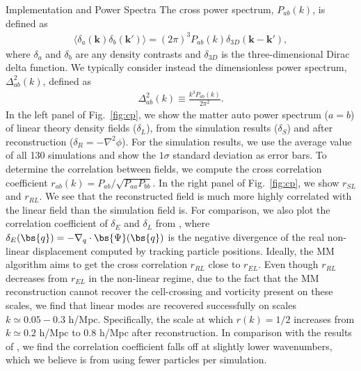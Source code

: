\begin{section}{Implementation and Power Spectra}
 The cross power spectrum, $P_{ab}(k)$, is defined as
 \begin{align}
   \langle \delta_a(\bm{k})\delta_b(\bm{k'}) \rangle =
   (2\pi)^3 P_{ab}(k) \delta_{3D}(\bm{k}-\bm{k'}),
 \end{align}
 where $\delta_{a}$ and $\delta_{b}$ are any density contrasts and
 $\delta_{3D}$ is the three-dimensional Dirac delta function. We typically consider instead
 the dimensionless power spectrum, $\Delta_{ab}^2(k)$, defined as
 \begin{align}
   \Delta_{ab}^2(k) \equiv \frac{k^3 P_{ab}(k)}{2\pi ^2}.
 \end{align}
 In the left panel of Fig.~\ref{fig:cp}, we show the matter auto power
 spectrum ($a=b$) of linear theory density fields ($\delta_L$), from
 the simulation results ($\delta_S$) and after reconstruction
 ($\delta_R=-\nabla^2\phi$).  For the simulation
 results, we use the average value of all 130 simulations and show
 the $1\sigma$ standard deviation as error bars.  To determine the correlation
 between fields, we compute the cross correlation coefficient
 $r_{ab}(k) = P_{ab}/\sqrt{P_{aa}P_{bb}}$.  In the right panel of
 Fig.~\ref{fig:cp}, we show $r_{SL}$ and $r_{RL}$.  We see that the
 reconstructed field is much more highly correlated with the linear
 field than the simulation field is.  For comparison, we also plot the 
 correlation coefficient of $\delta_E$ 
 and $\delta_L$ from \citet{bib:Yu2016}, 
 where $\delta_E(\bs{q})= - \nabla_q \cdot \bs{\Psi}(\bs{q})$ is the 
 negative divergence of the real non-linear displacement computed by tracking particle positions. 
 Ideally, the MM algorithm aims to get the cross correlation $r_{RL}$ close to $r_{EL}$. 
 Even though $r_{RL}$ decreases from $r_{EL}$ in the non-linear regime, due to the fact that the MM reconstruction 
 cannot recover the cell-crossing and vorticity present on these scales, we find that linear modes are recovered successfully on scales $k\simeq 0.05 - 0.3$ h/Mpc.
 Specifically, the scale at which $r(k)=1/2$ increases from $k\simeq 0.2$ h/Mpc to
 $0.8$ h/Mpc after reconstruction.  In comparison with the results of \citet{bib:ZhuH2016},
 we find the correlation coefficient falls off at slightly lower
 wavenumbers, which we believe is from using fewer particles per simulation.


\end{section}
